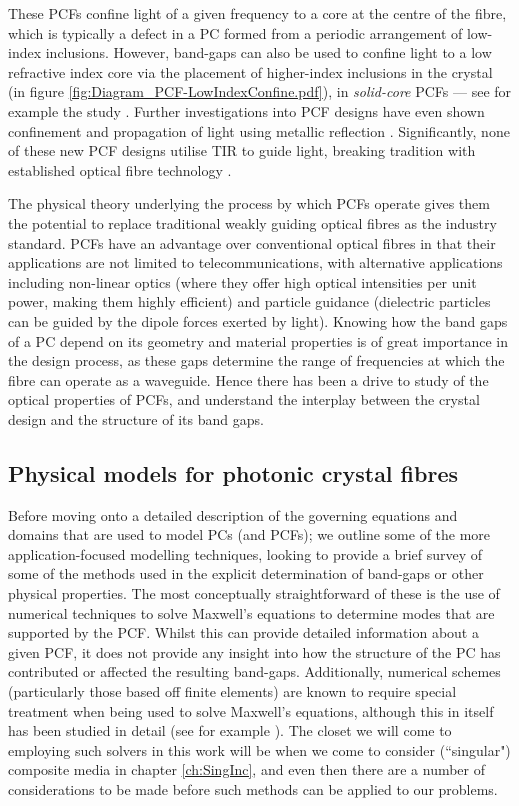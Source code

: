 These PCFs confine light of a given frequency to a core at the centre of the fibre, which is typically a defect in a PC formed from a periodic arrangement of low-index inclusions.
However, band-gaps can also be used to confine light to a low refractive index core via the placement of higher-index inclusions in the crystal (in figure \ref{fig:Diagram_PCF-LowIndexConfine.pdf}), in \emph{solid-core} PCFs --- see for example the study \cite{luan2004allsolid}.
Further investigations into PCF designs have even shown confinement and propagation of light using metallic reflection \cite{hou2008metallic}.
Significantly, none of these new PCF designs utilise TIR to guide light, breaking tradition with established optical fibre technology \cite{knight2003photonic, russell2003photonic}.

The physical theory underlying the process by which PCFs operate gives them the potential to replace traditional weakly guiding optical fibres as the industry standard.
PCFs have an advantage over conventional optical fibres in that their applications are not limited to telecommunications, with alternative applications including non-linear optics (where they offer high optical intensities per unit power, making them highly efficient) and particle guidance (dielectric particles can be guided by the dipole forces exerted by light).
Knowing how the band gaps of a PC depend on its geometry and material properties is of great importance in the design process, as these gaps determine the range of frequencies at which the fibre can operate as a waveguide.
Hence there has been a drive to study of the optical properties of PCFs, and understand the interplay between the crystal design and the structure of its band gaps.

\subsection{Physical models for photonic crystal fibres} \label{ssec:ExistingPCFModels}
Before moving onto a detailed description of the governing equations and domains that are used to model PCs (and PCFs); we outline some of the more application-focused modelling techniques, looking to provide a brief survey of some of the methods used in the explicit determination of band-gaps or other physical properties.
The most conceptually straightforward of these is the use of numerical techniques to solve Maxwell's equations to determine modes that are supported by the PCF.
Whilst this can provide detailed information about a given PCF, it does not provide any insight into how the structure of the PC has contributed or affected the resulting band-gaps.
Additionally, numerical schemes (particularly those based off finite elements) are known to require special treatment when being used to solve Maxwell's equations, although this in itself has been studied in detail (see for example \cite{monk2003finite}).
The closet we will come to employing such solvers in this work will be when we come to consider (``singular") composite media in chapter \ref{ch:SingInc}, and even then there are a number of considerations to be made before such methods can be applied to our problems.

